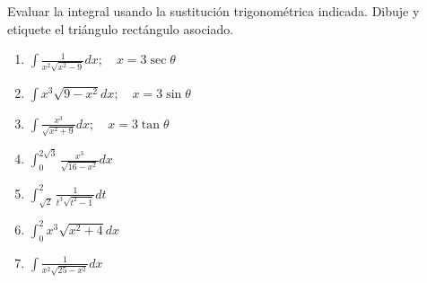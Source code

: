 \documentclass[12pt,]{article}
\begin{document}
Evaluar la integral usando la sustitución trigonométrica indicada.
Dibuje y etiquete el triángulo rectángulo asociado.

\begin{enumerate}
\def\labelenumi{\arabic{enumi}.}
\item
  \(\displaystyle\int\frac{1}{x^2\sqrt{x^2-9}}dx;\quad x=3\sec \theta\)
\item
  \(\displaystyle\int x^3\sqrt{9-x^2}dx;\quad x=3\sin\theta\)
\item
  \(\displaystyle\int\frac{x^3}{\sqrt{x^2+9}}dx;\quad x=3\tan\theta\)
\item
  \(\displaystyle\int_0^{2\sqrt{3}}\frac{x^3}{\sqrt{16-x^2}}dx\)
\item
  \(\displaystyle\int_{\sqrt{2}}^2\frac{1}{t^3\sqrt{t^2-1}}dt\)
\item
  \(\displaystyle\int_0^2x^3\sqrt{x^2+4}dx\)
\item
  \(\displaystyle\int\frac{1}{x^2\sqrt{25-x^2}}dx\)
\end{enumerate}
\end{document}
